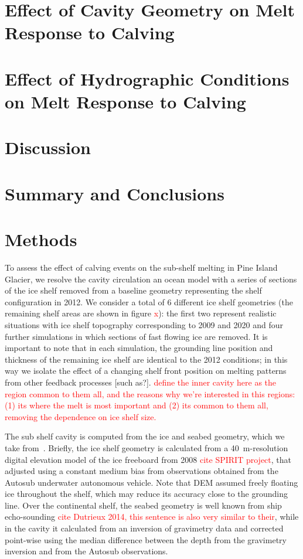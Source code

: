 \documentclass[draft]{agujournal2019}
\newcommand{\red}[1]{\textcolor{red}{#1}}
\begin{document}
\section{Effect of Cavity Geometry on Melt Response to Calving}

\section{Effect of Hydrographic Conditions on Melt Response to Calving}

\section{Discussion}

\section{Summary and Conclusions}




\section{Methods}
To assess the effect of calving events on the sub-shelf melting in Pine Island Glacier, we resolve the cavity circulation an ocean model with a series of sections of the ice shelf removed from a baseline geometry representing the shelf configuration in 2012. We consider a total of 6 different ice shelf geometries (the remaining shelf areas are shown in figure \red{x}): the first two represent realistic situations with ice shelf topography corresponding to 2009 and 2020 and four further simulations in which sections of fast flowing ice are removed. It is important to note that in each simulation, the grounding line position and thickness of the remaining ice shelf are identical to the 2012 conditions; in this way we isolate the effect of a changing shelf front position on melting patterns from other feedback processes [such as?]. \red{define the inner cavity here as the region common to them all, and the reasons why we're interested in this regions: (1) its where the melt is most important and (2) its common to them all, removing the dependence on ice shelf size.}

The sub shelf cavity is computed from the ice and seabed geometry, which we take from~. Briefly, the ice shelf geometry is calculated from a 40~m-resolution digital elevation model of the ice freeboard from 2008 \red{cite SPIRIT project}, that adjusted using a constant medium bias from observations obtained from the Autosub underwater autonomous vehicle. Note that DEM assumed freely floating ice throughout the shelf, which may reduce its accuracy close to the grounding line. Over the continental shelf, the seabed geometry is well known from ship echo-sounding \red{cite Dutrieux 2014, this sentence is also very similar to their}, while in the cavity it calculated from an inversion of gravimetry data and corrected point-wise using the median difference between the depth from the gravimetry inversion and from the Autosub observations. 
\end{document}
